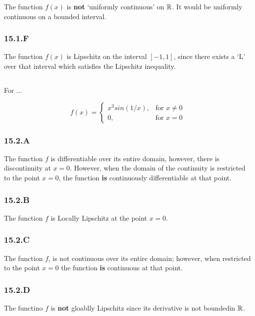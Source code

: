 The function $f(x)$ is \textbf{not} `uniformly continuous' on $\mathbb{R}$. It would be uniformly continuous on a bounded interval.

\subsubsection*{15.1.F}

The function $f(x)$ is Lipschitz on the interval $[-1, 1]$, since there exists a `L' over that interval which satisfies the Lipschitz inequality.


\subsection{}

For ...

$$
f(x) =
\begin{cases}
    x^{3}sin(1/x), & \text{for $x\neq0 $} \\
    0, & \text{for $x =0$}
\end{cases}
$$


\subsubsection*{15.2.A}

The function $f$ is differentiable over its entire domain, however, there is discontinuity at $x=0$. However, when the domain of the continuity is restricted to the point $x=0$, the function \textbf{is} continuously differentiable at that point.

\subsubsection*{15.2.B}

The function $f$ is Locally Lipschitz at the point $x=0$.

\subsubsection*{15.2.C}

The function $f$, is not continuous over its entire domain; however, when restricted to the point $x=0$ the function \textbf{is} continuous at that point.

\subsubsection*{15.2.D}
The functino $f$ is \textbf{not} gloablly Lipschitz since its derivative is not boundedin $\mathbb{R}$.
